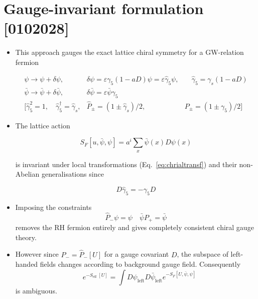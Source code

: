 \section{Gauge-invariant formulation [0102028]}
\begin{itemize}
  \item This approach gauges the exact lattice chiral symmetry for a GW-relation fermion

\begin{equation}
    \begin{array}{lll}
\psi \rightarrow \psi+\delta \psi, & \delta \psi=\varepsilon \gamma_{5}(1-a D) \psi=\varepsilon \hat{\gamma}_{5} \psi, &\quad \hat{\gamma}_{5}=\gamma_{s}(1-a D) \\
\bar{\psi} \rightarrow \bar{\psi}+\delta \bar{\psi}, & \delta \bar{\psi}=\varepsilon \bar{\psi} \gamma_{5} & \\
{[\hat{\gamma}_{5}^{2}=1,\quad \hat{\gamma}_{5}^{\dagger}=\hat{\gamma}_{s},} & \hat{P}_{ \pm}=\left(1 \pm \hat{\gamma}_{s}\right) / 2, & P_{ \pm}=\left(1 \pm \gamma_{5}\right) / 2]
\end{array}
\label{eq:chrialtransf}
\end{equation}


  \item The lattice action

\begin{equation}
S_{F}[u, \bar{\psi}, \psi]=a^{i} \sum_{x} \bar{\psi}(x) D \psi(x)
\end{equation}

is invariant under local transformations (Eq.~\eqref{eq:chrialtransf}) and their non-Abelian generalisations since

\begin{equation}
    D \hat{\gamma}_{5}=-\gamma_{5} D
\end{equation}


  \item Imposing the constraints
\begin{equation}
    \hat{P}_{-} \psi=\psi \quad \bar{\psi} P_{+}=\bar{\psi}
\end{equation}
removes the RH fermion entirely and gives completely consistent chiral gauge theory.

  \item However since \(\hat{P}_{-}=\hat{P}_{-}[U]\) for a gauge covariant \(D\), the subspace of left-handed fields changes according to background gauge field.
Consequently
\begin{equation}
\quad e^{-S_{\text {eff }}[U]}=\int D \psi_{\text {left}} D \bar{\psi}_{\text {left}} e^{-S_{F}[U,\bar{\psi}, \psi ]}
\end{equation}
is ambiguous.


\end{itemize}
